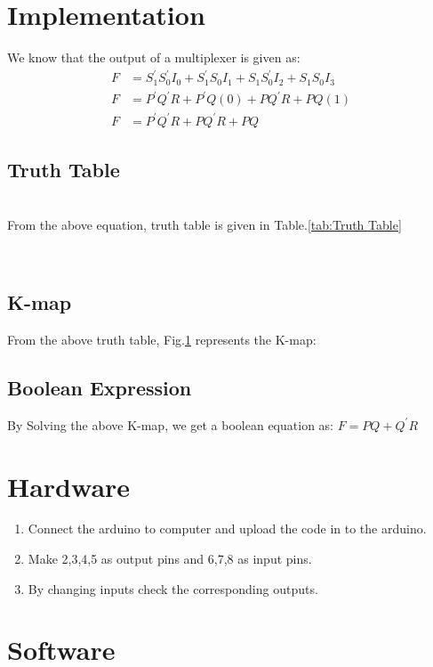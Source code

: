 \documentclass[journal,twocolumn,10pt, a4paper]{article}
\begin{document}
\section{Implementation}
We know that the output of a multiplexer is given as:
\begin{align}
F&=S_1^\prime S_0^\prime I_0+S_1^\prime S_0I_1+S_1S_0^\prime I_2+S_1S_0I_3\\ 
F&=P^\prime Q^\prime{R}+P^\prime Q(0)+PQ^\prime R+PQ(1)\\
F&=P^\prime Q^\prime R+PQ^\prime R+PQ
\end{align}


\subsection{Truth Table}\\
From the above equation, truth table is given in Table.\ref{tab:Truth Table}
\begin{table}[H]
\centering

\caption{}
\label{tab:Truth Table}
\end{table}\\

\subsection{K-map}
From the above truth table, Fig.\ref{fig:Fig 2} represents the K-map:
\begin{figure}[H]

\caption{}
\label{fig:Fig 2}
\end{figure}
\subsection{Boolean Expression}
By Solving the above K-map, we get a boolean equation as: $F=PQ+{Q^\prime}R$

\section{Hardware}
\begin{enumerate}
\item Connect the arduino to computer and upload the code in to the arduino.
\item Make 2,3,4,5 as output pins and 6,7,8 as input pins.
\item By changing inputs check the corresponding outputs.
\end{enumerate}

\section{Software}

\end{document}
